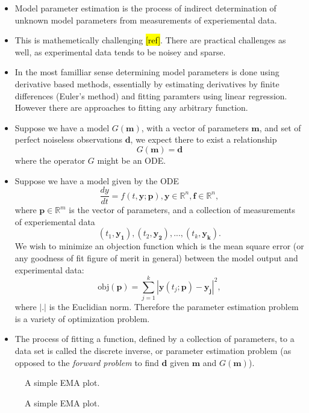 \documentclass[10pt,a4paper]{article}
\begin{document}
\begin{itemize}
\item Model parameter estimation is the process of indirect determination of unknown model parameters  from measurements of experiemental data.
\item This is mathemetically challenging \hl{[ref]}. There are practical challenges as well, as experimental data tends to be noisey and sparse.
\item In the most familliar sense determining model parameters is done using derivative based methods, essentially by estimating derivatives by finite differences (Euler's method) and fitting paramters using linear regression. However there are approaches to fitting any arbitrary function.
\item Suppose we have a model $G(\mathbf{m})$, with a vector of parameters $\mathbf{m}$, and set of perfect noiseless observations $\mathbf{d}$, we expect there to exist a relationship 
\[G(\mathbf{m}) = \mathbf{d} \]
where the operator $G$ might be an ODE.
\item Suppose we have a model given by the ODE
\[ \frac{dy}{dt} = f(t, \mathbf{y}; \mathbf{p}), \mathbf{y} \in \mathbb{R}^n, \mathbf{f} \in \mathbb{R}^n ,\]
where $\mathbf{p} \in \mathbb{R}^m$ is the vector of parameters, and a collection of measurements of experiemental data
\[ \left( t_1, \mathbf{y_1} \right), 
\left( t_2, \mathbf{y_2} \right), ... ,
\left( t_k, \mathbf{y_k} \right).\]
We wish to minimize an objection function which is the mean square error (or any goodness of fit figure of merit in general) between the model output and experimental data:
\[ \mbox{obj}(\mathbf{p}) = \sum_{j=1}^k \left|\mathbf{y}(t_j; \mathbf{p}) - \mathbf{y_j} \right|^2,\]
where $| . |$ is the Euclidian norm. Therefore the parameter estimation problem is a variety of optimization problem.
\item The process of fitting a function, defined by a collection of parameters, to a data set is called the discrete inverse, or parameter estimation problem (as opposed to the \emph{forward problem} to find $\mathbf{d}$ given $\mathbf{m}$ and $G(\mathbf{m})$).
\end{itemize}

\begin{figure}[htb]
    \centering
    \resizebox{14cm}{!}{}
    \caption{A simple EMA plot.\label{fig:trajectories}}
\end{figure}

\begin{figure}[htb]
    \centering
    \resizebox{14cm}{!}{}
    \caption{A simple EMA plot.\label{fig:inverse_problem}}
\end{figure}
\end{document}
